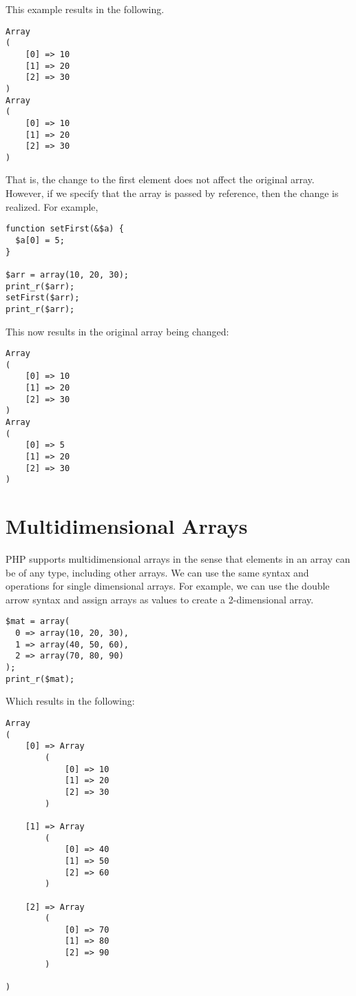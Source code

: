 This example results in the following.

\begin{verbatim}
Array
(
    [0] => 10
    [1] => 20
    [2] => 30
)
Array
(
    [0] => 10
    [1] => 20
    [2] => 30
)
\end{verbatim}

That is, the change to the first element does not affect the
original array.  However, if we specify that the array is passed
by reference, then the change is realized.  For example, 

\begin{verbatim}
function setFirst(&$a) {
  $a[0] = 5;
}

$arr = array(10, 20, 30);
print_r($arr);
setFirst($arr);
print_r($arr);
\end{verbatim}

This now results in the original array being changed:

\begin{verbatim}
Array
(
    [0] => 10
    [1] => 20
    [2] => 30
)
Array
(
    [0] => 5
    [1] => 20
    [2] => 30
)
\end{verbatim}

\section{Multidimensional Arrays}

PHP supports multidimensional arrays in the sense that
elements in an array can be of any type, including other 
arrays. We can use the same syntax and operations for single
dimensional arrays.  For example, we can use the double
arrow syntax and assign arrays as values to create a 2-dimensional
array.

\begin{verbatim}
$mat = array(
  0 => array(10, 20, 30),
  1 => array(40, 50, 60),
  2 => array(70, 80, 90)
);
print_r($mat);
\end{verbatim}

Which results in the following:

\begin{verbatim}
Array
(
    [0] => Array
        (
            [0] => 10
            [1] => 20
            [2] => 30
        )

    [1] => Array
        (
            [0] => 40
            [1] => 50
            [2] => 60
        )

    [2] => Array
        (
            [0] => 70
            [1] => 80
            [2] => 90
        )

)
\end{verbatim}

